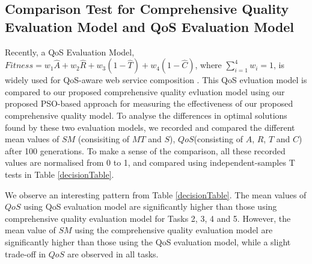 \documentclass{llncs}
\begin{document}
\subsection{Comparison Test for Comprehensive Quality Evaluation Model and QoS Evaluation Model}\label{comparisonTest}

Recently, a QoS Evaluation Model, $Fitness = w_1 \hat{A} + w_2 \hat{R} + w_3(1 - \hat{T}) + w_4(1 - \hat{C})$, where $\sum_{i=1}^{4} w_i = 1$, is widely used for QoS-aware web service composition \cite{ma2015hybrid,da2016particle,da2015graphevol}. This QoS evluation model is compared to our proposed comprehensive quality evluation model using our proposed PSO-based approach for measuring the effectiveness of our proposed comprehensive quality model. To analyse the differences in optimal solutions found by these two evaluation models, we recorded and compared the different mean values of $SM$ (consisiting of $MT$ and $S$), $QoS$(consisting of $A$, $R$, $T$ and $C$) after 100 generations. To make a sense of the comparison, all these recorded values are normalised from 0 to 1, and compared using independent-samples T tests in Table \ref{decisionTable}. 

We observe an interesting pattern from Table \ref{decisionTable}. The mean values of $QoS$ using QoS evaluation model are significantly higher than those using comprehensive quality evaluation model for Tasks 2, 3, 4 and 5. However, the mean value of $SM$ using the comprehensive quality evaluation model are significantly higher than those using the QoS evaluation model, while a slight trade-off in $QoS$ are observed in all tasks.
\end{document}
